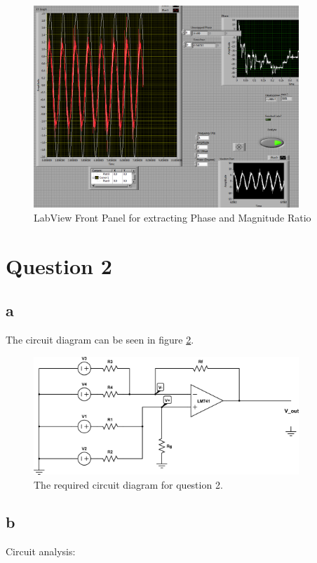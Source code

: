 \documentclass{article}
\theoremstyle{plain}
\theoremstyle{definition}
\theoremstyle{remark}
\begin{document}
\begin{figure}[h]
\begin{center}
\includegraphics[width = 10cm]{frontPannel.png}
\caption{LabView Front Panel for extracting Phase and Magnitude Ratio}
\label{q1_j2}
\end{center}
\end{figure}

\section*{Question 2}

\subsection*{a}
The circuit diagram can be seen in figure \ref{q2_a}.
\begin{figure}[h]
\begin{center}
\includegraphics[width=10cm]{q2_circuitDiagram.png}
\end{center}
\caption{The required circuit diagram for question 2.}
\label{q2_a}
\end{figure}


\subsection*{b}
Circuit analysis:\\
\end{document}
